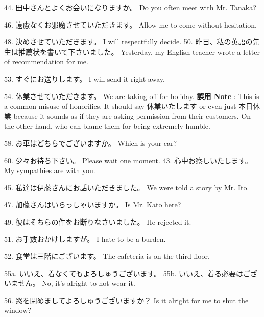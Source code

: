 \par{44. 田中さんとよくお会いになりますか。 \hfill\break
Do you often meet with Mr. Tanaka? }

\par{46. 遠慮なくお邪魔させていただきます。 \hfill\break
Allow me to come without hesitation. }

\par{48. 決めさせていただきます。 \hfill\break
I will respectfully decide. }
50. 昨日、私の英語の先生は推薦状を書いて下さいました。 \hfill\break
Yesterday, my English teacher wrote a letter of recommendation for me. 
\par{53. すぐにお送りします。 \hfill\break
I will send it right away. }

\par{54. 休業させていただきます。 \hfill\break
We are taking off for holiday. \hfill\break
\hfill\break
\textbf{誤用 Note }: This is a common misuse of honorifics. It should say 休業いたします or even just 本日休業 because it sounds as if they are asking permission from their customers. On the other hand, who can blame them for being extremely humble. }

\par{58. お車はどちらでございますか。 \hfill\break
Which is your car? }

\par{60. 少々お待ち下さい。 \hfill\break
Please wait one moment. }
 43. 心中お察しいたします。 \hfill\break
My sympathies are with you. 
\par{45. 私達は伊藤さんにお話いただきました。 \hfill\break
We were told a story by Mr. Ito. }

\par{47. 加藤さんはいらっしゃいますか。 \hfill\break
Is Mr. Kato here? }

\par{49. 彼はそちらの件をお断りなさいました。 \hfill\break
He rejected it. }

\par{51. お手数おかけしますが。 \hfill\break
I hate to be a burden. }

\par{52. 食堂は三階にございます。 \hfill\break
The cafeteria is on the third floor. }

\par{55a. いいえ、着なくてもよろしゅうございます。 \hfill\break
55b. いいえ、着る必要はございません。 \hfill\break
No, it's alright to not wear it. }

\par{56. 窓を閉めましてよろしゅうございますか？ \hfill\break
Is it alright for me to shut the window? }

